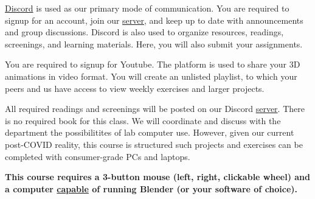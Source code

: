 \href{http://discordapp.com/}{Discord} is used as our primary mode of communication. You are required to signup for an account, join our \href{\discordURL}{server}, and keep up to date with announcements and group discussions. Discord is also used to organize resources, readings, screenings, and learning materials. Here, you will also submit your assignments.

You are required to signup for Youtube. The platform is used to share your 3D animations in video format. You will create an unlisted playlist, to which your peers and us have access to view weekly exercises and larger projects.

All required readings and screenings will be posted on our Discord \href{\discordURL}{server}. There is no required book for this class. We will coordinate and discuss with the department the possibilitites of lab computer use. However, given our current post-COVID reality, this course is structured such projects and exercises can be completed with consumer-grade PCs and laptops.

\textbf{This course requires a 3-button mouse (left, right, clickable wheel) and a computer \href{https://www.blender.org/download/requirements/}{capable} of running Blender (or your software of choice).}